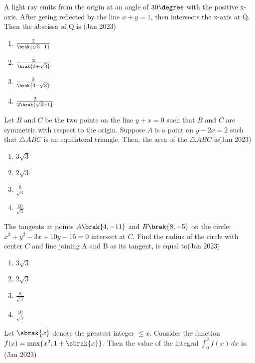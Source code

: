 \item A light ray emits from the origin at an angle of $30\degree$ with the positive x-axis. After geting reflected by the line $x + y = 1$, then intersects the x-axis at Q. Then the abscissa of Q is \hfill(Jan 2023)
\begin{multicols}{2}
\begin{enumerate}
    \item $\frac{2}{\brak{\sqrt{3} - 1}}$\\
     \item $\frac{2}{\brak{3 + \sqrt{3}}}$
     \item $\frac{2}{\brak{3 - \sqrt{3}}}$\\
     \item $\frac{2}{2\brak{\sqrt{3} + 1}}$
\end{enumerate}
\end{multicols}
\item Let $B$ and $C$ be the two points on the line $y + x = 0$
such that $B$ and $C$ are symmetric with respect to the origin. Suppose $A$ is a point on $y - 2x = 2$ such that $\triangle ABC$ is an equilateral triangle. Then, the area of the $\triangle ABC$ is\hfill(Jan 2023)
\begin{multicols}{4}
\begin{enumerate}
    \item $3\sqrt{3}$
   \item $2\sqrt{3}$
   \item $\frac{8}{\sqrt{3}}$
   \item $\frac{10}{\sqrt{3}}$
\end{enumerate}
\end{multicols}
\item The tangents at points  $A\brak{4, -11}$ and $B\brak{8, -5}$ on the circle: $x^2 + y^2 - 3x + 10y - 15 = 0$ intersect at $C$. Find the radius of the circle with center $C$ and line joining A and B as its
tangent, is equal to\hfill(Jan 2023)
\begin{multicols}{4}
\begin{enumerate}
    \item $3\sqrt{3}$
   \item $2\sqrt{3}$
   \item $\frac{8}{\sqrt{3}}$
   \item $\frac{10}{\sqrt{3}}$
\end{enumerate}
\end{multicols}
\item Let $\sbrak{x}$ denote the greatest integer $\leq x$. Consider the function $f(x) = \max \{x^2, 1 + \sbrak{x}\}$. Then the value of the integral $\int_0^2 f(x)\,dx$ is: \hfill (Jan 2023)
